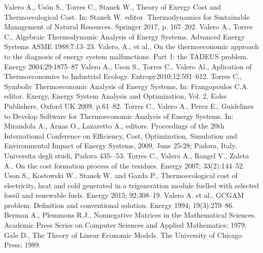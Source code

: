 \documentclass{ecos2018}
\begin{document}
\begin{thebibliography}{11}
\setlength{\itemsep}{0pt}
\setlength{\parsep}{0pt}
Valero A., Usón S., Torres C., Stanek W., Theory of Exergy Cost and Thermoecological Cost.
In: Stanek W. editor. Thermodynamics for Sustainable Management of Natural Resources. Springer 2017, p. 167--202.
Valero A., Torres C., Algebraic Thermodynamic Analysis of Energy Systems. Advanced Energy Systems ASME 1988;7:13--23.
Valero, A., et al., 
On the thermoeconomic approach to the diagnosis of energy system malfunctions. Part 1: the TADEUS problem. 
Energy 2004;29:1875--87
Valero A., Uson S., Torres C., Valero Al., Aplication of Thermoeconomics to Industrial Ecology.
Entropy2010;12:591--612.
Torres C.,
Symbolic Thermoeconomic Analysis of Energy Systems,
In: Frangopoulos C.A. editor. Exergy, Energy System Analysis and Optimization, Vol. 2,
Eolss Publishers, Oxford UK 2009. p.61--82.
Torres C., Valero A., Perez E., Guidelines to Develop Software for Thermoeconomic Analysis of Energy Systems. 
In: Mirandola A., Arnas O., Lazaretto A., editors. 
Proceedings of the 20th International Conference on Efficiency, Cost, Optimization, Simulation and Environmental Impact of Energy Systems, 2009, June 25-28; Padova, Italy.
Universita degli studi, Padova 435-–53.
Torres C., Valero A., Rangel V., Zaleta A.,
On the cost formation process of the residues.
Energy 2007; 33(2):144--52.
Uson S., Kostowski W., Stanek W. and Gazda P., 
Thermoecological cost of electricity, heat and cold generated in a trigeneration module fuelled with selected fossil and renewable fuels. 
Energy 2015; 92:308--19.
Valero A. et al., 
GCGAM problem: Definition and conventional solution. 
Energy 1994; 19(3):279--86.
Berman A., Plemmons R.J., Nonnegative Matrices in the Mathematical Sciences. Academic Press Series on Computer Sciences and Applied Mathematics; 1979.
Gale D., The Theory of Linear Economic Models. The University of Chicago Press; 1989.
\end{thebibliography}
\end{document}
